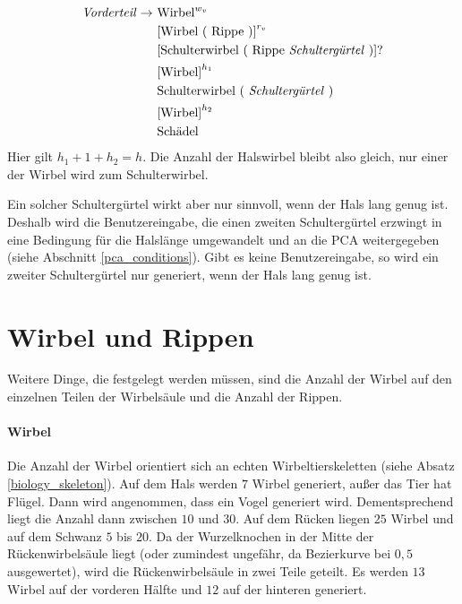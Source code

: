 \begin{align*}
 \text{\emph{Vorderteil}} \rightarrow &\text{ Wirbel}^{w_v}\\
    &\text{ [Wirbel ( Rippe )]}^{r_v}\\
    &\text{ [Schulterwirbel ( Rippe \emph{Schultergürtel} )]?}\\
    &\text{ [Wirbel]}^{h_1}\\
    &\text{ Schulterwirbel ( \emph{Schultergürtel} )}\\
    &\text{ [Wirbel]}^{h_2}\\
    &\text{ Schädel}\\ 
\end{align*}
Hier gilt $h_1 + 1 + h_2 = h$. Die Anzahl der Halswirbel bleibt also gleich, nur einer der Wirbel wird zum Schulterwirbel.

Ein solcher Schultergürtel wirkt aber nur sinnvoll, wenn der Hals lang genug ist. Deshalb wird die Benutzereingabe, die einen zweiten Schultergürtel erzwingt in eine Bedingung für die Halslänge umgewandelt und an die PCA weitergegeben (siehe Abschnitt \ref{pca_conditions}). Gibt es keine Benutzereingabe, so wird ein zweiter Schultergürtel nur generiert, wenn der Hals lang genug ist.


\section{Wirbel und Rippen}
\label{section:vertebrae_ribs}

Weitere Dinge, die festgelegt werden müssen, sind die Anzahl der Wirbel auf den einzelnen Teilen der Wirbelsäule und die Anzahl der Rippen.

\paragraph{Wirbel}
Die Anzahl der Wirbel orientiert sich an echten Wirbeltierskeletten (siehe Absatz \ref{biology_skeleton}). Auf dem Hals werden $7$ Wirbel generiert, außer das Tier hat Flügel. Dann wird angenommen, dass ein Vogel generiert wird. Dementsprechend liegt die Anzahl dann zwischen $10$ und $30$. Auf dem Rücken liegen $25$ Wirbel und auf dem Schwanz $5$ bis $20$.
Da der Wurzelknochen in der Mitte der Rückenwirbelsäule liegt (oder zumindest ungefähr, da Bezierkurve bei $0,5$ ausgewertet), wird die Rückenwirbelsäule in zwei Teile geteilt. Es werden $13$ Wirbel auf der vorderen Hälfte und $12$ auf der hinteren generiert.

